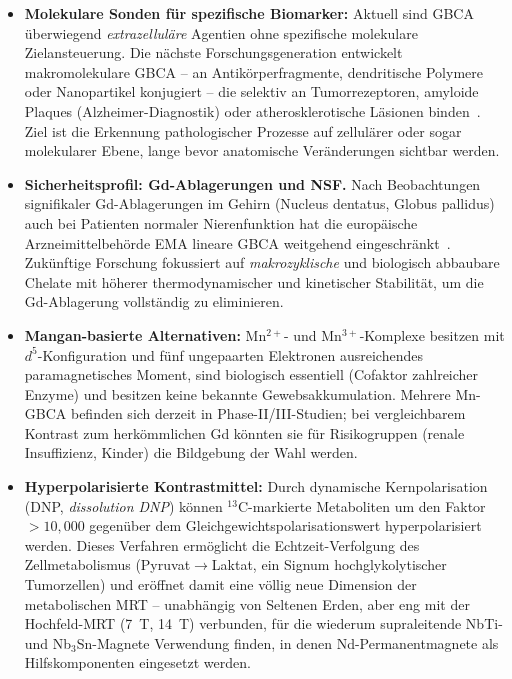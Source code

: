 ﻿\documentclass[12pt, a4paper]{report}
\theoremstyle{definition}
\theoremstyle{remark}
\begin{document}
\begin{itemize}
  \item \textbf{Molekulare Sonden für spezifische Biomarker:} Aktuell sind
    GBCA überwiegend \emph{extrazelluläre} Agentien ohne spezifische
    molekulare Zielansteuerung. Die nächste Forschungsgeneration entwickelt
    makromolekulare GBCA -- an Antikörperfragmente, dendritische Polymere
    oder Nanopartikel konjugiert -- die selektiv an Tumorrezeptoren,
    amyloide Plaques (Alzheimer-Diagnostik) oder atherosklerotische
    Läsionen binden~\cite{caravan1999}. Ziel ist die Erkennung pathologischer
    Prozesse auf zellulärer oder sogar molekularer Ebene, lange bevor
    anatomische Veränderungen sichtbar werden.

  \item \textbf{Sicherheitsprofil: Gd-Ablagerungen und NSF.}
    Nach Beobachtungen signifikaler Gd-Ablagerungen im Gehirn (Nucleus
    dentatus, Globus pallidus) auch bei Patienten normaler Nierenfunktion
    hat die europäische Arzneimittelbehörde EMA lineare GBCA weitgehend
    eingeschränkt~\cite{kanda2014}. Zukünftige Forschung fokussiert auf
    \emph{makrozyklische} und biologisch abbaubare Chelate mit höherer
    thermodynamischer und kinetischer Stabilität, um die Gd-Ablagerung
    vollständig zu eliminieren.

  \item \textbf{Mangan-basierte Alternativen:}
    Mn$^{2+}$- und Mn$^{3+}$-Komplexe besitzen mit $d^5$-Konfiguration und
    fünf ungepaarten Elektronen ausreichendes paramagnetisches Moment, sind
    biologisch essentiell (Cofaktor zahlreicher Enzyme) und besitzen keine
    bekannte Gewebsakkumulation. Mehrere Mn-GBCA befinden sich derzeit in
    Phase-II/III-Studien; bei vergleichbarem Kontrast zum herkömmlichen Gd
    könnten sie für Risikogruppen (renale Insuffizienz, Kinder) die Bildgebung
    der Wahl werden.

  \item \textbf{Hyperpolarisierte Kontrastmittel:}
    Durch dynamische Kernpolarisation (DNP, \emph{dissolution DNP}) können
    $^{13}$C-markierte Metaboliten um den Faktor $>10\!{,}000$ gegenüber dem
    Gleichgewichtspolarisationswert hyperpolarisiert werden. Dieses Verfahren
    ermöglicht die Echtzeit-Verfolgung des Zellmetabolismus (Pyruvat$\to$Laktat,
    ein Signum hochglykolytischer Tumorzellen) und eröffnet damit eine
    völlig neue Dimension der metabolischen MRT -- unabhängig von Seltenen
    Erden, aber eng mit der Hochfeld-MRT (7~T, 14~T) verbunden, für die
    wiederum supraleitende NbTi- und Nb$_3$Sn-Magnete Verwendung finden, in
    denen Nd-Permanentmagnete als Hilfskomponenten eingesetzt werden.
\end{itemize}
\end{document}
